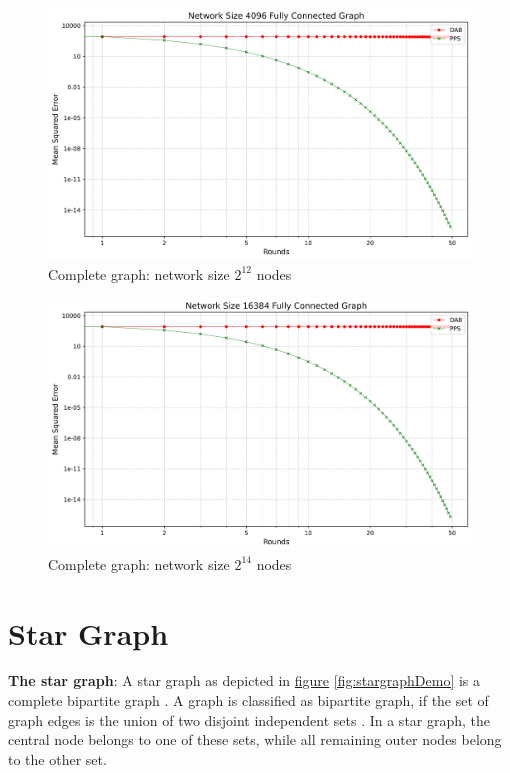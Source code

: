 \begin{figure}[H]
    \centering
    \includegraphics[scale=0.5]{figures/completeGraphSimulations/DAB_vs_PPS_FCG_r50_n4096.png}
    \caption{Complete graph: network size $2^{12}$ nodes}
    \label{fig:4096CompleteGraph}
\end{figure}
\begin{figure}[H]
    \centering
    \includegraphics[scale=0.5]{figures/completeGraphSimulations/DAB_vs_PPS_FCG_r50_n16384.png}
    \caption{Complete graph: network size $2^{14}$ nodes}
    \label{fig:16384CompleteGraph}
\end{figure}


\section{Star Graph}
\textbf{The star graph}: A star graph as depicted in \hyperref[fig:stargraphDemo]{figure} \ref{fig:stargraphDemo} is a complete bipartite graph \cite{west2001introduction}. A graph is classified as bipartite graph, if the set of graph edges is the union of two disjoint independent sets \cite{GraphTheorySchindelhaauer2021}. In a star graph, the central node belongs to one of these sets, while all remaining outer nodes belong to the other set.

